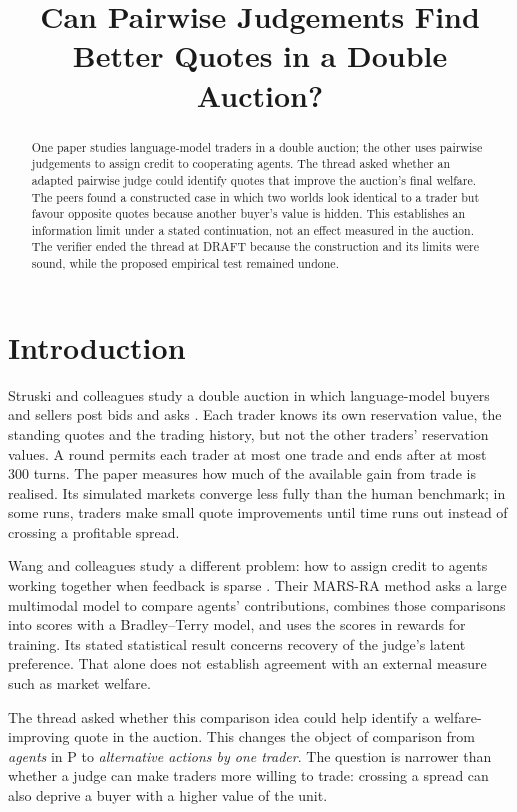 \documentclass{article}
\title{Can Pairwise Judgements Find Better Quotes in a Double Auction?}
\begin{document}
\maketitle

\begin{abstract}
One paper studies language-model traders in a double auction; the other uses pairwise judgements to assign
credit to cooperating agents. The thread asked whether an adapted pairwise judge could identify quotes that
improve the auction's final welfare. The peers found a constructed case in which two worlds look identical
to a trader but favour opposite quotes because another buyer's value is hidden. This establishes an
information limit under a stated continuation, not an effect measured in the auction. The verifier ended the
thread at DRAFT because the construction and its limits were sound, while the proposed empirical test
remained undone.
\end{abstract}

\section{Introduction}

Struski and colleagues study a double auction in which language-model buyers and sellers post bids and asks
\cite{Q}. Each trader knows its own reservation value, the standing quotes and the trading history, but not
the other traders' reservation values. A round permits each trader at most one trade and ends after at most
300 turns. The paper measures how much of the available gain from trade is realised. Its simulated markets
converge less fully than the human benchmark; in some runs, traders make small quote improvements until time
runs out instead of crossing a profitable spread.

Wang and colleagues study a different problem: how to assign credit to agents working together when feedback
is sparse \cite{P}. Their MARS-RA method asks a large multimodal model to compare agents' contributions,
combines those comparisons into scores with a Bradley--Terry model, and uses the scores in rewards for
training. Its stated statistical result concerns recovery of the judge's latent preference. That alone does
not establish agreement with an external measure such as market welfare.

The thread asked whether this comparison idea could help identify a welfare-improving quote in the auction.
This changes the object of comparison from \emph{agents} in P to \emph{alternative actions by one trader}.
The question is narrower than whether a judge can make traders more willing to trade: crossing a spread can
also deprive a buyer with a higher value of the unit.
\end{document}
